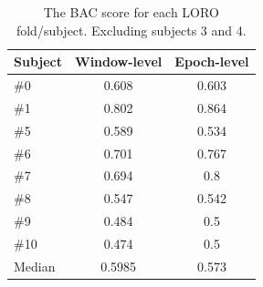         \begin{table}[h]
            \centering
            \begin{tabular}{lcc}
            \toprule
                \textbf{Subject} & \textbf{Window-level} & \textbf{Epoch-level} \\
            \midrule
            \#0  & 0.608  & 0.603 \\
            \#1  & 0.802  & 0.864 \\
            \#5  & 0.589  & 0.534 \\
            \#6  & 0.701  & 0.767 \\
            \#7  & 0.694  & 0.8   \\
            \#8  & 0.547  & 0.542 \\
            \#9  & 0.484  & 0.5   \\
            \#10 & 0.474  & 0.5   \\
            \midrule
            Median & 0.5985 & 0.573 \\
            \bottomrule
            \end{tabular}
            \caption{The BAC score for each LORO fold/subject. Excluding subjects 3 and 4.}
        \end{table}


